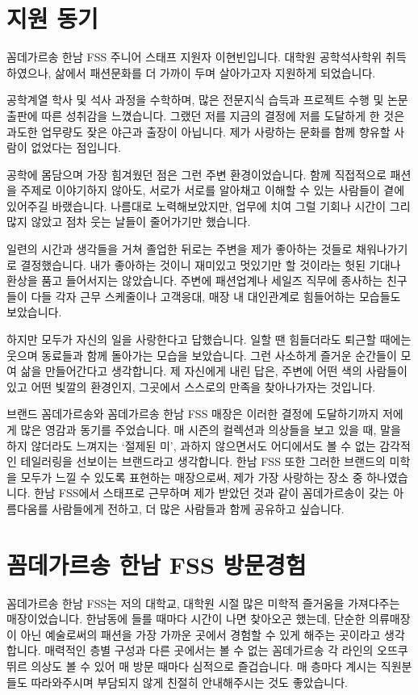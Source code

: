 \section*{지원 동기}
꼼데가르송 한남 FSS 주니어 스태프 지원자 이현빈입니다. 대학원 공학석사학위 취득하였으나, 삶에서 패션문화를 더 가까이 두며 살아가고자 지원하게 되었습니다.

공학계열 학사 및 석사 과정을 수학하며, 많은 전문지식 습득과 프로젝트 수행 및 논문출판에 따른 성취감을 느꼈습니다. 그랬던 저를 지금의 결정에 저를 도달하게 한 것은 과도한 업무량도 잦은 야근과 출장이 아닙니다. 제가 사랑하는 문화를 함께 향유할 사람이 없었다는 점입니다.

공학에 몸담으며 가장 힘겨웠던 점은 그런 주변 환경이었습니다. 함께 직접적으로 패션을 주제로 이야기하지 않아도, 서로가 서로를 알아채고 이해할 수 있는 사람들이 곁에 있어주길 바랬습니다. 나름대로 노력해보았지만, 업무에 치여 그럴 기회나 시간이 그리 많지 않았고 점차 웃는 날들이 줄어가기만 했습니다.

일련의 시간과 생각들을 거쳐 졸업한 뒤로는 주변을 제가 좋아하는 것들로 채워나가기로 결정했습니다. 내가 좋아하는 것이니 재미있고 멋있기만 할 것이라는 헛된 기대나 환상을 품고 들어서지는 않았습니다. 주변에 패션업계나 세일즈 직무에 종사하는 친구들이 다들 각자 근무 스케줄이나 고객응대, 매장 내 대인관계로 힘들어하는 모습들도 보았습니다.

하지만 모두가 자신의 일을 사랑한다고 답했습니다. 일할 땐 힘들더라도 퇴근할 때에는 웃으며 동료들과 함께 돌아가는 모습을 보았습니다. 그런 사소하게 즐거운 순간들이 모여 삶을 만들어간다고 생각합니다. 제 자신에게 내린 답은, 주변에 어떤 색의 사람들이 있고 어떤 빛깔의 환경인지, 그곳에서 스스로의 만족을 찾아나가자는 것입니다.

브랜드 꼼데가르송와 꼼데가르송 한남 FSS 매장은 이러한 결정에 도달하기까지 저에게 많은 영감과 동기를 주었습니다. 매 시즌의 컬렉션과 의상들을 보고 있을 때, 말을 하지 않더라도 느껴지는 `절제된 미', 과하지 않으면서도 어디에서도 볼 수 없는 감각적인 테일러링을 선보이는 브랜드라고 생각합니다. 한남 FSS 또한 그러한 브랜드의 미학을 모두가 느낄 수 있도록 표현하는 매장으로써, 제가 가장 사랑하는 장소 중 하나였습니다. 한남 FSS에서 스태프로 근무하며 제가 받았던 것과 같이 꼼데가르송이 갖는 아름다움를 사람들에게 전하고, 더 많은 사람들과 함께 공유하고 싶습니다.

\section*{꼼데가르송 한남 FSS 방문경험}
꼼데가르송 한남 FSS는 저의 대학교, 대학원 시절 많은 미학적 즐거움을 가져다주는 매장이었습니다. 한남동에 들를 때마다 시간이 나면 찾아오곤 했는데, 단순한 의류매장이 아닌 예술로써의 패션을 가장 가까운 곳에서 경험할 수 있게 해주는 곳이라고 생각합니다. 매력적인 층별 구성과 다른 곳에서는 볼 수 없는 꼼데가르송 각 라인의 오뜨쿠뛰르 의상도 볼 수 있어 매 방문 때마다 심적으로 즐겁습니다. 매 층마다 계시는 직원분들도 따라와주시며 부담되지 않게 친절히 안내해주시는 것도 좋았습니다.


